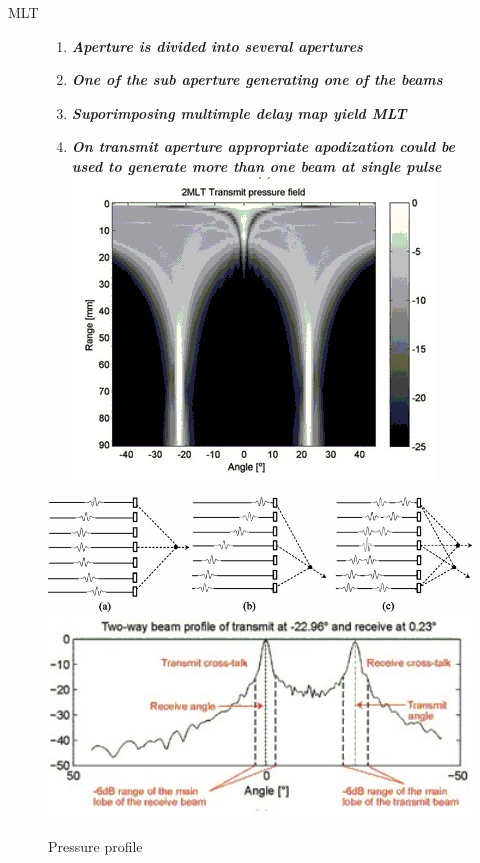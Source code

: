 \documentclass[t,12pt,english
\ifx\beamermode\undefined\else,\beamermode\fi
]{beamer}
\begin{document}
\begin{frame}{MLT}

\begin{figure}[!htb]
\begin{block}{\footnotesize{\tiny }}\tiny{}
\begin{enumerate} 
\vspace{0.05cm}

     \item \tiny{\textbf{\textit{Aperture is divided into several apertures}}}
     \item \tiny{\textbf{\textit{One of the sub aperture generating one of the beams}}}
     \item \tiny{\textbf{\textit{Suporimposing multimple delay map yield MLT}}}
\color{green}
     \item \tiny{\textbf{\textit{On transmit aperture appropriate apodization could be used to generate more than one beam at single pulse}}}\\
\includegraphics[width=.7\textwidth]{MLT.jpg}\\
\end{enumerate}
\end{block}
\endminipage
{}
\centering
\includegraphics[width=1\textwidth]{MLT_beamforming1.jpg}\\
\includegraphics[width=1\textwidth]{MLTpressure.jpg}\\
\caption{ \tiny{Pressure profile \cite{6}}}
\endminipage
\end{figure}


\end{frame}
\end{document}
